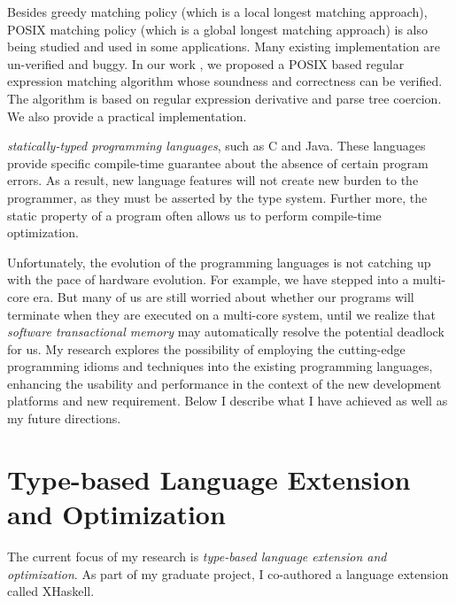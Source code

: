\documentclass[12pt]{article}
\theoremstyle{plain} \numberwithin{equation}{section}
\theoremstyle{definition}
\newcommand{\kl}[1]{}
\begin{document}
Besides greedy matching policy (which is a local longest matching approach),
POSIX matching policy (which is a global longest matching approach) is also being studied
and used in some applications. Many existing implementation are un-verified and buggy.
In our work \cite{DBLP:conf/flops/SulzmannL14}, we proposed
a POSIX based regular expression matching algorithm whose soundness and correctness can be
verified. The algorithm is based on regular expression derivative and parse tree coercion.
We also provide a practical implementation.





\kl{debugging}



\kl{rewriting frontier}

{\em statically-typed
programming languages}, such as C and Java. These languages
provide specific compile-time guarantee about the absence of certain
program errors. As a result, new language features will not create new
burden to the programmer, as they must be asserted by the type system.
Further more, the static property of a program often allows us 
to perform compile-time optimization. 

\kl{What is the problem?}
Unfortunately, the evolution of the programming languages 
is not catching up with the pace of hardware evolution.
For example, we have stepped into a multi-core era.
But many of us are still worried about whether our programs will terminate when they are executed on a multi-core system, until we realize
that {\em software transactional memory} \cite{stm} may automatically 
resolve the potential deadlock for us. 
My research explores the possibility of employing the cutting-edge
programming idioms and techniques into the existing 
programming languages, enhancing the usability and performance
in the context of the new development platforms and new requirement. 
Below I describe what I have achieved as well as my future directions.


\section{Type-based Language Extension and Optimization}

The current focus of my research is {\em type-based language 
extension and optimization}. As part of my 
graduate project, I co-authored a language extension called XHaskell.


\end{document}
